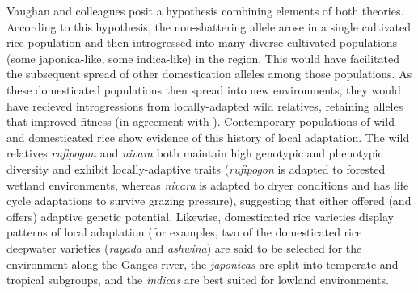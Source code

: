 \documentclass[11pt]{article}
\begin{document}
\begin{enumerate}

Vaughan and colleagues \cite{vaughan2008evolving} posit a hypothesis combining elements of both theories.
According to this hypothesis, the non-shattering allele arose in a single cultivated rice population and then introgressed into many diverse cultivated populations (some japonica-like, some indica-like) in the region.
This would have facilitated the subsequent spread of other domestication alleles among those populations.
As these domesticated populations then spread into new environments, they would have recieved introgressions from locally-adapted wild relatives, retaining alleles that improved fitness (in agreement with \cite{second1982origin}).
Contemporary populations of wild and domesticated rice show evidence of this history of local adaptation.
The wild relatives \emph{rufipogon} and \emph{nivara} both maintain high genotypic and phenotypic diversity and exhibit locally-adaptive traits (\emph{rufipogon} is adapted to forested wetland environments, whereas \emph{nivara} is adapted to dryer conditions and has life cycle adaptations to survive grazing pressure), suggesting that either offered (and offers) adaptive genetic potential.
Likewise, domesticated rice varieties display patterns of local adaptation (for examples, two of the domesticated rice deepwater varieties (\emph{rayada} and \emph{ashwina}) are said to be selected for the environment along the Ganges river, the \emph{japonicas} are split into temperate and tropical subgroups, and the \emph{indicas} are best suited for lowland environments.


\end{enumerate}
\end{document}
